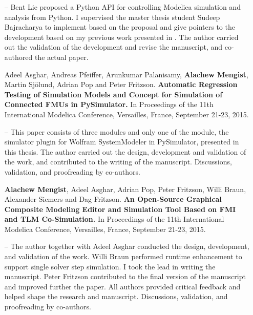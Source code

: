\begin{itemize}
\item[--] Bent Lie proposed a Python API for controlling Modelica simulation and analysis from Python. I supervised the master thesis student Sudeep Bajracharya to implement based on the proposal and give pointers to the development based on my previous work presented in \cite{alachewpysimulator} . The author carried out the validation of the development and revise the manuscript, and co-authored the actual paper.


\item[\begin{NoHyper} \cite{alachewpysimulator} \end{NoHyper}] Adeel Asghar, Andreas Pfeiffer, Arunkumar Palanisamy, \textbf{Alachew Mengist}, Martin Sj\"{o}lund, Adrian Pop and Peter Fritzson.\textbf{ Automatic Regression Testing of Simulation Models and Concept for Simulation of Connected FMUs in PySimulator.} In Proceedings of the 11th International Modelica Conference, Versailles, France, September 21-23, 2015. 


\item[--]This paper consists of three modules and only one of the module, the simulator plugin for Wolfram SystemModeler in PySimulator, presented in this thesis. The author carried out the design, development and validation of the work, and contributed to the writing of the manuscript. Discussions, validation, and proofreading by co-authors.


\item[\begin{NoHyper} \cite{alachewtlm} \end{NoHyper}] \textbf{Alachew Mengist}, Adeel Asghar, Adrian Pop, Peter Fritzson, Willi Braun, Alexander Siemers and Dag Fritzson.\textbf{ An Open-Source Graphical Composite Modeling Editor and Simulation Tool Based on FMI and TLM Co-Simulation.} In Proceedings of the 11th International Modelica Conference, Versailles, France, September 21-23, 2015. 


\item[--]The author together with Adeel Asghar conducted the design, development, and validation of the work. Willi Braun performed runtime enhancement to support single solver step simulation. I took the lead in writing the manuscript. Peter Fritzson contributed to the final version of the manuscript and improved further the paper. All authors provided critical feedback and helped shape the research and manuscript. Discussions, validation, and proofreading by co-authors.



\end{itemize}
